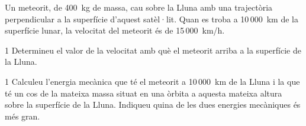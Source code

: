 Un meteorit, de 400~kg de massa, cau sobre la Lluna amb una trajectòria perpendicular a la superfície d'aquest satèl·lit. Quan es troba a 10\,000~km de la superfície lunar, la velocitat del meteorit és de 15\,000~km/h.

\begin{apartat}{1}
Determineu el valor de la velocitat amb què el meteorit arriba a la superfície de la Lluna.
\end{apartat}

\begin{apartat}{1}
Calculeu l'energia mecànica que té el meteorit a 10\,000~km de la Lluna i la que té un cos de la mateixa massa situat en una òrbita a aquesta mateixa altura sobre la superfície de la Lluna. Indiqueu quina de les dues energies mecàniques és més gran.
\end{apartat}


